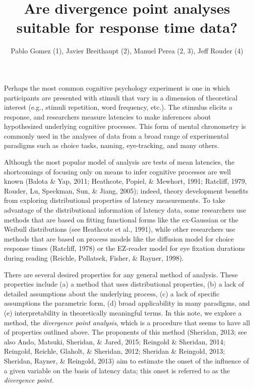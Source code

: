 \documentclass[man]{apa}%
\title{Are divergence point analyses suitable for response time data?}
\author{Pablo Gomez (1), Javier Breithaupt (2), Manuel Perea (2, 3), Jeff Rouder (4)}
\affiliation{(1) DePaul University, Chicago IL, USA \\ 
                 (2) Universitat de Val\`encia, Valencia, Spain \\ 
                 (3) BCBL, Basque Center on Cognition, Brain, and Language, San Sebasti\'an, Spain \\
                 (4) University of Missouri, Columbia MO, USA}
\begin{document}

\maketitle   



Perhaps the most common cognitive psychology experiment is one in which participants are presented with stimuli that vary in a dimension of theoretical interest (e.g., stimuli repetition, word frequency, etc.). The stimulus elicits a response, and researchers  measure latencies to make inferences about hypothesized underlying cognitive processes.  This form of mental chronometry is commonly used in the analyses of data from a broad range of experimental paradigms such as choice tasks, naming, eye-tracking, and many others.

   Although the most popular model of analysis are tests of mean latencies, the shortcomings of focusing only on  means to infer cognitive processes are well known (Balota \& Yap, 2011; Heathcote, Popiel, \& Mewhort, 1991; Ratcliff, 1979, Rouder, Lu, Speckman, Sun,  \& Jiang, 2005); indeed, theory development benefits from exploring distributional properties of latency measurements.  To take advantage of the distributional information of latency data, some researchers use methods that are based on fitting functional forms like the ex-Gaussian or the Weibull distributions (see Heathcote et al., 1991), while other researchers use methods that are based on process models like the diffusion model for choice response times (Ratcliff, 1978) or the EZ-reader model for eye fixation durations during reading (Reichle, Pollatsek, Fisher, \& Rayner, 1998). 
           
       There are several desired properties for any general method of analysis. These properties include (a) a method that uses distributional properties, (b) a lack of detailed assumptions about the underlying process, (c) a lack of specific assumptions the parametric form, (d) broad applicability in many paradigms, and (e) interpretability in theoretically meaningful terms. In this note, we explore a method, the \emph{divergence point analysis}, which is a procedure that seems to have all of  properties outlined above. The proponents of this method (Sheridan, 2013; see also Ando, Matsuki, Sheridan, \& Jared, 2015; Reingold \& Sheridan, 2014; Reingold, Reichle, Glaholt, \& Sheridan, 2012; Sheridan \& Reingold, 2013; Sheridan, Rayner, \& Reingold, 2013) aim to estimate the onset of the influence of a given variable on the basis of latency data; this onset is referred to as the \emph{divergence point}.
               
\end{document}

